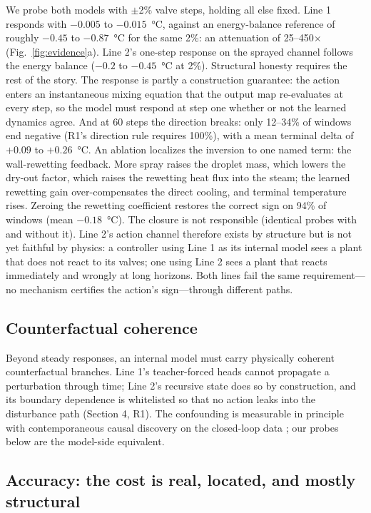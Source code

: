 \documentclass{article}
\begin{document}
We probe both models with $\pm$2\% valve steps, holding all else fixed. Line 1 responds
with $-0.005$ to $-0.015$~\si{\degreeCelsius}, against an energy-balance reference of
roughly $-0.45$ to $-0.87$~\si{\degreeCelsius} for the same 2\%: an attenuation of
25--450$\times$ (Fig.~\ref{fig:evidence}a). Line 2's one-step response on the sprayed
channel follows the energy balance ($-0.2$ to $-0.45$~\si{\degreeCelsius} at 2\%).
Structural honesty requires the rest of the story. The response is partly a
construction guarantee: the action enters an instantaneous mixing equation that the
output map re-evaluates at every step, so the model must respond at step one whether
or not the learned dynamics agree. And at 60 steps the direction breaks: only 12--34\%
of windows end negative (R1's direction rule requires 100\%), with a mean terminal
delta of $+0.09$ to $+0.26$~\si{\degreeCelsius}. An ablation localizes the inversion
to one named term: the wall-rewetting feedback. More spray raises the droplet mass,
which lowers the dry-out factor, which raises the rewetting heat flux into the steam;
the learned rewetting gain over-compensates the direct cooling, and terminal
temperature rises. Zeroing the rewetting coefficient restores the correct sign on
94\% of windows (mean $-0.18$~\si{\degreeCelsius}). The closure is not responsible
(identical probes with and without it). Line 2's action channel therefore exists by
structure but is not yet faithful by physics: a controller using Line 1 as its
internal model sees a plant that does not react to its valves; one using Line 2 sees a
plant that reacts immediately and wrongly at long horizons. Both lines fail the same
requirement---no mechanism certifies the action's sign---through different paths.

\subsection{Counterfactual coherence}

Beyond steady responses, an internal model must carry physically coherent counterfactual
branches. Line 1's teacher-forced heads cannot propagate a perturbation through time;
Line 2's recursive state does so by construction, and its boundary dependence is
whitelisted so that no action leaks into the disturbance path (Section 4, R1). The
confounding is measurable in principle with contemporaneous causal discovery on the
closed-loop data \cite{runge2020pcmci}; our probes below are the model-side equivalent.

\subsection{Accuracy: the cost is real, located, and mostly structural}
\end{document}
